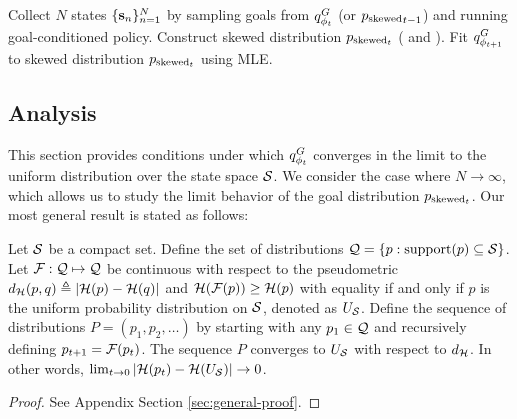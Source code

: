 \vspace{0.1in}
\begin{algorithm}
   	\fcaption{\METHOD}
   	\label{alg:method}
   	\begin{algorithmic}[1]
        \STATE Collect $N$ states $\{\mathbf{s}_n\}_{n=1}^N$ by sampling goals from ${q^G_{{\phi}_t}}$ (or ${p_{\text{skewed}}}_{t-1}$) and running goal-conditioned policy.
        \STATE Construct skewed distribution ${p_{\text{skewed}_t}}$ ( and ).
        \STATE Fit ${q^G_{{\phi}_{t+1}}}$ to skewed distribution ${p_{\text{skewed}_t}}$ using MLE.
   	\ENDFOR
   	\end{algorithmic}
\end{algorithm}

\subsection{\METHOD Analysis}\label{sec:analysis}
This section provides conditions under which ${q^G_{{\phi}_t}}$ converges in the limit to the uniform distribution over the state space ${\mathcal{S}}$.
We consider the case where $N \rightarrow \infty$, which allows us to study the limit behavior of the goal distribution ${p_{\text{skewed}_t}}$.
Our most general result is stated as follows:
\begin{lemma}\label{lemma:general-convergence}
Let ${\mathcal{S}}$ be a compact set.
Define the set of distributions ${\mathcal{Q}} = \{p : {\text{support}}(p) \subseteq {\mathcal{S}}\}$.
Let ${\mathcal{F}}: {\mathcal{Q}} \mapsto {\mathcal{Q}}$ be continuous with respect to the pseudometric \mbox{${d_{\mathcal{H}}}(p, q) \triangleq |{\mathcal{H}}(p) - {\mathcal{H}}(q)|$} and ${\mathcal{H}}({\mathcal{F}}(p)) \geq {\mathcal{H}}(p)$ with equality if and only if $p$ is the uniform probability distribution on ${\mathcal{S}}$, denoted as ${U_{\mathcal{S}}}$.
Define the sequence of distributions $P = (p_1, p_2, \dots)$ by starting with any $p_1 \in {\mathcal{Q}}$ and recursively defining $p_{t+1} = {\mathcal{F}}(p_t)$.
The sequence $P$ converges to ${U_{\mathcal{S}}}$ with respect to ${d_{\mathcal{H}}}$. In other words, \mbox{$\lim_{t \rightarrow 0} |{\mathcal{H}}(p_t) - {\mathcal{H}}({U_{\mathcal{S}}})| \rightarrow 0$}.
\end{lemma}
\begin{proof}
See Appendix Section \ref{sec:general-proof}.
\end{proof}

